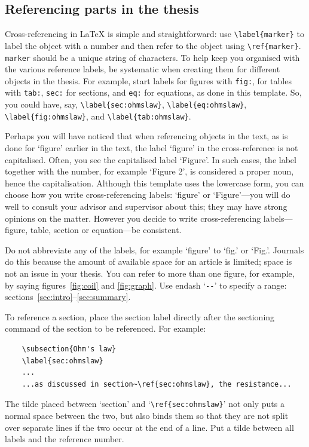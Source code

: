\documentclass[english, 12pt, a4paper, sci, utf8, a-2b, online]{aaltothesis}
\begin{document}
\subsection{Referencing parts in the thesis}

Cross-referencing in \LaTeX{} is simple and straightforward: use 
\verb+\label{marker}+ to label the object with a number and then refer to the 
object using \verb+\ref{marker}+. \texttt{marker} should be a unique string of 
characters. To help keep you organised with the various reference labels, be 
systematic when creating them for different objects in the thesis. For example, 
start labels for figures with \texttt{fig:}, for tables with \texttt{tab:}, 
\texttt{sec:} for sections, and \texttt{eq:} for equations, as done in this 
template. So, you could have, say, \verb+\label{sec:ohmslaw}+, 
\verb+\label{eq:ohmslaw}+, \verb+\label{fig:ohmslaw}+, and 
\verb+\label{tab:ohmslaw}+.

Perhaps you will have noticed that when referencing objects in the text, as is 
done for `figure' earlier in the text, the label ‘figure’ in the cross-reference
is not capitalised. Often, you see the capitalised label ‘Figure’. In such 
cases, the label together with the number, for example ‘Figure 2’, is 
considered a proper noun, hence the capitalisation. Although this template uses 
the lowercase form, you can choose how you write cross-referencing labels: 
‘figure’ or ‘Figure’---you will do well to consult your advisor and supervisor 
about this; they may have strong opinions on the matter. However you decide to 
write cross-referencing labels---figure, table, section or equation---be 
consistent.

Do not abbreviate any of the labels, for example ‘figure’ to ‘fig.’ or ‘Fig.’. 
Journals do this because the amount of available space for an article is 
limited; space is not an issue in your thesis. You can refer to more than one 
figure, for example, by saying figures~\ref{fig:coil} and \ref{fig:graph}. Use 
endash `\verb+--+' to specify a range: sections~\ref{sec:intro}--\ref{sec:summary}.

To reference a section, place the section label directly after the sectioning 
command of the section to be referenced. For example:
\begin{verbatim}
	\subsection{Ohm's law}
	\label{sec:ohmslaw}
	...
	...as discussed in section~\ref{sec:ohmslaw}, the resistance...
\end{verbatim}
The tilde placed between `section' and `\verb+\ref{sec:ohmslaw}+' not only puts 
a normal space between the two, but also binds them so that they are not split 
over separate lines if the two occur at the end of a line. Put a tilde between 
all labels and the reference number.
\end{document}
